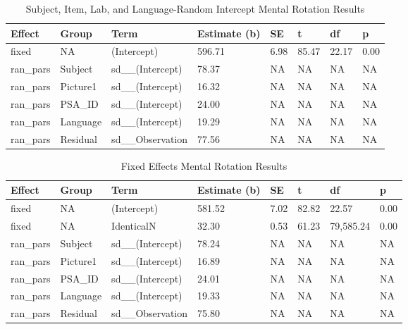 \documentclass[
  man,floatsintext]{apa7}
\begin{document}
\begin{table}[tbp]

\begin{center}
\begin{threeparttable}

\caption{\label{tab:lang_e}Subject, Item, Lab, and Language-Random Intercept Mental Rotation Results}

\begin{tabular}{llllllll}
\toprule
Effect & Group & Term & Estimate (b) & SE & t & df & p\\
\midrule
fixed & NA & (Intercept) & 596.71 & 6.98 & 85.47 & 22.17 & 0.00\\
ran\_pars & Subject & sd\_\_(Intercept) & 78.37 & NA & NA & NA & NA\\
ran\_pars & Picture1 & sd\_\_(Intercept) & 16.32 & NA & NA & NA & NA\\
ran\_pars & PSA\_ID & sd\_\_(Intercept) & 24.00 & NA & NA & NA & NA\\
ran\_pars & Language & sd\_\_(Intercept) & 19.29 & NA & NA & NA & NA\\
ran\_pars & Residual & sd\_\_Observation & 77.56 & NA & NA & NA & NA\\
\bottomrule
\end{tabular}

\end{threeparttable}
\end{center}

\end{table}

\begin{table}[tbp]

\begin{center}
\begin{threeparttable}

\caption{\label{tab:fixed_e}Fixed Effects Mental Rotation Results}

\begin{tabular}{llllllll}
\toprule
Effect & Group & Term & Estimate (b) & SE & t & df & p\\
\midrule
fixed & NA & (Intercept) & 581.52 & 7.02 & 82.82 & 22.57 & 0.00\\
fixed & NA & IdenticalN & 32.30 & 0.53 & 61.23 & 79,585.24 & 0.00\\
ran\_pars & Subject & sd\_\_(Intercept) & 78.24 & NA & NA & NA & NA\\
ran\_pars & Picture1 & sd\_\_(Intercept) & 16.89 & NA & NA & NA & NA\\
ran\_pars & PSA\_ID & sd\_\_(Intercept) & 24.01 & NA & NA & NA & NA\\
ran\_pars & Language & sd\_\_(Intercept) & 19.33 & NA & NA & NA & NA\\
ran\_pars & Residual & sd\_\_Observation & 75.80 & NA & NA & NA & NA\\
\bottomrule
\end{tabular}

\end{threeparttable}
\end{center}

\end{table}
\end{document}
